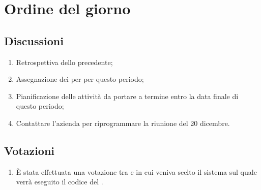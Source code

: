 \section{Ordine del giorno} \label{sec:agenda}
\subsection{Discussioni} \label{subsec:discussione}
\begin{enumerate}
    \item Retrospettiva dello  precedente;
    \item Assegnazione dei  per per questo periodo;
    \item Pianificazione delle attività da portare a termine entro la data finale di questo periodo;
    \item Contattare l'azienda  per riprogrammare la riunione del 20 dicembre.
    
\end{enumerate}

\subsection{Votazioni} \label{subsec:votazione}
\begin{enumerate}
    \item È stata effettuata una votazione tra  e  in cui veniva scelto il sistema sul quale verrà eseguito il codice del .
\end{enumerate}